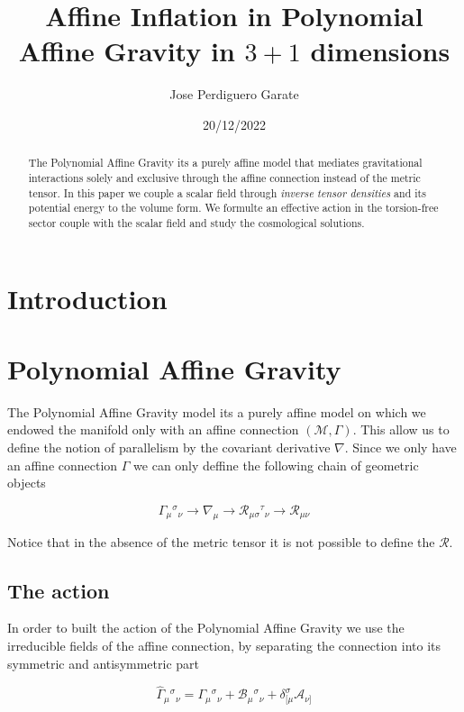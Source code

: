 \documentclass[10pt,a4paper]{article}
\title{Affine Inflation in Polynomial Affine Gravity in $3+1$ dimensions}
\author{Jose Perdiguero Garate}
\date{20/12/2022}
\begin{document}
\maketitle

\begin{abstract}
  The Polynomial Affine Gravity its a purely affine model that mediates gravitational interactions solely and exclusive through the
  affine connection instead of the metric tensor. In this paper we couple a scalar field through \textit{inverse tensor densities} and 
  its potential energy to the volume form. We formulte an effective action in the torsion-free sector couple with the scalar field and
  study the cosmological solutions.
\end{abstract}

\tableofcontents

\section{Introduction}

\section{Polynomial Affine Gravity}

The Polynomial Affine Gravity model its a purely affine model on which we endowed the manifold only with an affine connection 
$(\mathcal{M}, \Gamma)$. This allow us to define the notion of parallelism by the covariant derivative $\nabla$. Since we only
have an affine connection $\Gamma$ we can only deffine the following chain of geometric objects

\begin{equation}
  \Gamma_{\mu}{}^{\sigma}{}_{\nu} \to
  \nabla_\mu \to \mathcal{R}_{\mu\sigma}{}^{\tau}{}_{\nu} \to \mathcal{R}_{\mu\nu}  
\end{equation} 

Notice that in the absence of the metric tensor it is not possible to define the $\mathcal{R}$.

\subsection{The action}

In order to built the action of the Polynomial Affine Gravity we use the irreducible fields of the affine connection,
by separating the connection into its symmetric and antisymmetric part

\begin{equation}
  \hat{\Gamma}_{\mu}{}^{\sigma}{}_{\nu} = \Gamma_{\mu}{}^{\sigma}{}_{\nu} + \mathcal{B}_{\mu}{}^{\sigma}{}_{\nu} + \delta^{\sigma}_{[\mu}\mathcal{A}_{\nu]}
\end{equation}
\end{document}

